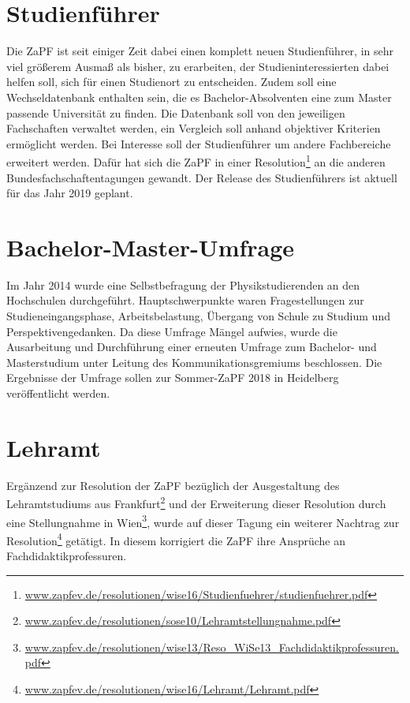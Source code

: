 \section*{Studienführer}
Die ZaPF ist seit einiger Zeit dabei einen komplett neuen Studienführer, in sehr viel größerem Ausmaß als bisher, zu erarbeiten, der Studieninteressierten 
dabei helfen soll, sich für einen Studienort zu entscheiden. Zudem soll eine Wechseldatenbank enthalten sein, die es Bachelor-Absolventen eine zum Master 
passende Universität zu finden. Die Datenbank soll von den jeweiligen Fachschaften verwaltet werden, ein Vergleich soll anhand objektiver Kriterien ermöglicht werden. 
Bei Interesse soll der Studienführer um andere Fachbereiche erweitert werden. Dafür hat sich die ZaPF in einer 
Resolution\footnote{\href{https://zapfev.de/resolutionen/wise16/Studienfuehrer/studienfuehrer.pdf}{\url{www.zapfev.de/resolutionen/wise16/Studienfuehrer/studienfuehrer.pdf}}} 
an die anderen Bundesfachschaftentagungen gewandt. Der Release des Studienführers ist aktuell für das Jahr 2019 geplant.

\section*{Bachelor-Master-Umfrage}
Im Jahr 2014 wurde eine Selbstbefragung der Physikstudierenden an den Hochschulen durchgeführt. Hauptschwerpunkte waren Fragestellungen zur Studieneingangsphase, 
Arbeitsbelastung, Übergang von Schule zu Studium und Perspektivengedanken. Da diese Umfrage Mängel aufwies, wurde die Ausarbeitung und Durchführung einer erneuten 
Umfrage zum Bachelor- und Masterstudium unter Leitung des Kommunikationsgremiums beschlossen. Die Ergebnisse der Umfrage sollen zur Sommer-ZaPF 2018 in 
Heidelberg veröffentlicht werden.

\section*{Lehramt}
Ergänzend zur Resolution der ZaPF bezüglich der Ausgestaltung des Lehramtstudiums aus 
Frankfurt\footnote{\href{https://zapfev.de/resolutionen/sose10/Lehramtstellungnahme.pdf}{\url{www.zapfev.de/resolutionen/sose10/Lehramtstellungnahme.pdf}}} 
und der Erweiterung dieser Resolution durch eine Stellungnahme in 
Wien\footnote{\href{https://zapfev.de/resolutionen/wise13/Reso_WiSe13_Fachdidaktikprofessuren.pdf}{\url{www.zapfev.de/resolutionen/wise13/Reso_WiSe13_Fachdidaktikprofessuren.pdf}}}, 
wurde auf dieser Tagung ein weiterer Nachtrag zur Resolution\footnote{\href{https://zapfev.de/resolutionen/wise16/Lehramt/Lehramt.pdf}{\url{www.zapfev.de/resolutionen/wise16/Lehramt/Lehramt.pdf}}} 
getätigt. In diesem korrigiert die ZaPF ihre Ansprüche an Fachdidaktikprofessuren. 

